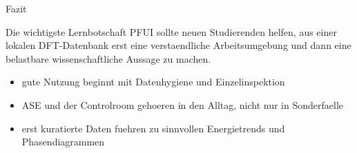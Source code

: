 \documentclass[aspectratio=169,10pt]{beamer}
\begin{document}
\begin{frame}{Fazit}
  \begin{block}{Die wichtigste Lernbotschaft}
    PFUI sollte neuen Studierenden helfen, aus einer lokalen DFT-Datenbank erst eine verstaendliche Arbeitsumgebung und dann eine belastbare wissenschaftliche Aussage zu machen.
  \end{block}

  \vspace{0.4cm}
  \begin{itemize}
    \item gute Nutzung beginnt mit Datenhygiene und Einzelinspektion
    \item ASE und der Controlroom gehoeren in den Alltag, nicht nur in Sonderfaelle
    \item erst kuratierte Daten fuehren zu sinnvollen Energietrends und Phasendiagrammen
  \end{itemize}
\end{frame}
\end{document}
